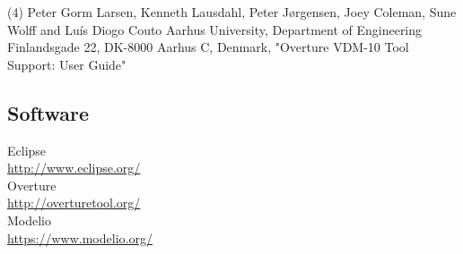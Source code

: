 \documentclass{article}
\begin{document}
\noindent
(4) Peter Gorm Larsen, Kenneth Lausdahl, Peter Jørgensen, Joey Coleman, Sune Wolff and Luís Diogo Couto Aarhus University, Department of Engineering Finlandsgade 22, DK-8000 Aarhus C, Denmark, "Overture VDM-10 Tool Support: User Guide"\\
\subsection{Software}

Eclipse \\
\vspace{3mm}\url{http://www.eclipse.org/} \\
Overture \\
\vspace{3mm}\url{http://overturetool.org/} \\
Modelio \\
\vspace{3mm}\url{https://www.modelio.org/} \\
\end{document}

